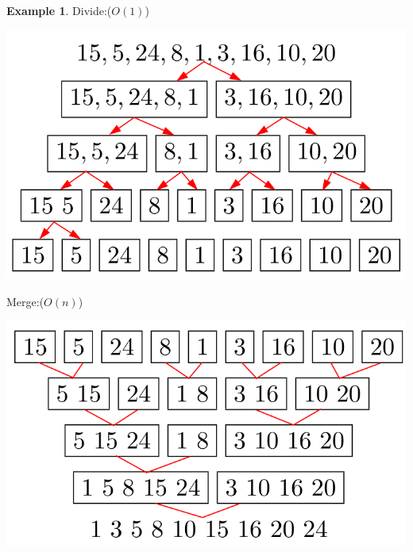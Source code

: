 \documentclass[10pt, a4paper]{extarticle}
\theoremstyle{definition}
\newtheorem{eg}{Example}
\begin{document}
	\begin{eg}
		Divide:($O(1)$)
		\begin{center}
			\includegraphics[scale=0.3]{merge-sort1.png}\\
		\end{center}
		Merge:($O(n)$)
		\begin{center}
			\includegraphics[scale=0.3]{merge-sort2.png}\\
		\end{center}
	\end{eg}
\end{document}

